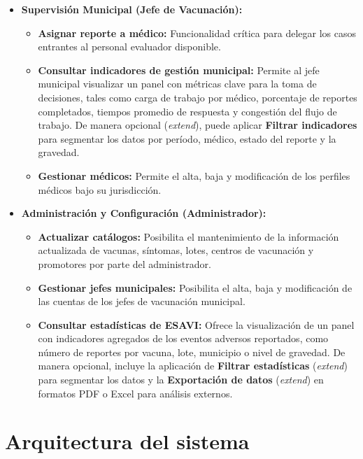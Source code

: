\begin{itemize}
    \item \textbf{Supervisión Municipal (Jefe de Vacunación):}
    \begin{itemize}
        \item \textbf{Asignar reporte a médico:} Funcionalidad crítica para delegar los casos entrantes al personal evaluador disponible.
        \item \textbf{Consultar indicadores de gestión municipal:} Permite al jefe municipal visualizar un panel con métricas clave para la toma de decisiones, tales como carga de trabajo por médico, porcentaje de reportes completados, tiempos promedio de respuesta y congestión del flujo de trabajo. De manera opcional (\textit{extend}), puede aplicar \textbf{Filtrar indicadores} para segmentar los datos por período, médico, estado del reporte y la gravedad.
        \item \textbf{Gestionar médicos:} Permite el alta, baja y modificación de los perfiles médicos bajo su jurisdicción.
    \end{itemize}

    \item \textbf{Administración y Configuración (Administrador):}
    \begin{itemize}
        \item \textbf{Actualizar catálogos:} Posibilita el mantenimiento de la información actualizada de vacunas, síntomas, lotes, centros de vacunación y promotores por parte del administrador.
        \item \textbf{Gestionar jefes municipales:} Posibilita el alta, baja y modificación de las cuentas de los jefes de vacunación municipal.
        \item \textbf{Consultar estadísticas de ESAVI:} Ofrece la visualización de un panel con indicadores agregados de los eventos adversos reportados, como número de reportes por vacuna, lote, municipio o nivel de gravedad. De manera opcional, incluye la aplicación de \textbf{Filtrar estadísticas} (\textit{extend}) para segmentar los datos y la \textbf{Exportación de datos} (\textit{extend}) en formatos PDF o Excel para análisis externos.
    \end{itemize}
\end{itemize}



\section{Arquitectura del sistema}
\label{section:arquitectura}

